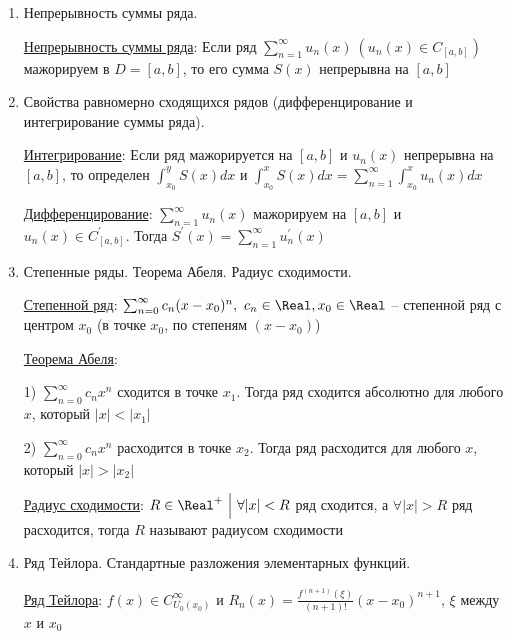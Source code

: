 \begin{enumerate}
    Тогда $\sum_{n = 1}^\infty u_n(x)$ равномерно сходящийся, а $\sum_{n = 1}^\infty \alpha_n$ называют мажорирующим

    \item Непрерывность суммы ряда.

    \hyperlink{functionalsumcontinuity}{Непрерывность суммы ряда}: \Ths Если ряд $\sum_{n = 1}^\infty u_n(x) \ (u_n(x) \in C_{[a, b]})$ мажорируем в $D = [a, b]$, то 
    его сумма $S(x)$ непрерывна на $[a, b]$

    \item Свойства равномерно сходящихся рядов (дифференцирование и интегрирование суммы
    ряда).

    \hyperlink{functionalsumintegral}{Интегрирование}: \Ths Если ряд мажорируется на $[a, b]$ и $u_n(x)$ непрерывна на $[a, b]$, то определен $\int_{x_0}^y S(x)dx$ и 
    $\int_{x_0}^x S(x)dx  = \sum_{n = 1}^\infty \int_{x_0}^x u_n(x) dx$

    \hyperlink{functionalsumderivative}{Дифференцирование}: \Ths $\sum_{n = 1}^\infty u_n(x)$ мажорируем на $[a, b]$ и $u_n(x) \in C^\prime_{[a, b]}$.
    Тогда $S^\prime(x) = \sum_{n = 1}^\infty u^\prime_n(x)$

    \item Степенные ряды. Теорема Абеля. Радиус сходимости.

    \hyperlink{powerseries}{Степенной ряд}: $\sum_{n = 0}^\infty c_n(x - x_0)^n, \ c_n \in \Real, x_0 \in \Real$ -- степенной ряд с центром $x_0$ (в точке $x_0$, по степеням $(x - x_0)$)

    \hyperlink{abelstheorem}{Теорема Абеля}:  

    1) $\sum_{n = 0}^\infty c_n x^n$ сходится в точке $x_1$. Тогда ряд сходится абсолютно для любого $x$, который $|x| < |x_1|$

    2) $\sum_{n = 0}^\infty c_n x^n$ расходится в точке $x_2$. Тогда ряд расходится для любого $x$, который $|x| > |x_2|$

    \hyperlink{convergenceradius}{Радиус сходимости}: $R \in \Real^+ \ \Big| \ \forall |x| < R $ ряд сходится, а $\forall |x| > R$ ряд расходится, тогда $R$ называют радиусом сходимости

    \item Ряд Тейлора. Стандартные разложения элементарных функций.

    \hyperlink{taylorsseries}{Ряд Тейлора}: $f(x) \in C^\infty_{U_0(x_0)}$ и $R_n(x) = \frac{f^{(n + 1)}(\xi)}{(n + 1)!} (x - x_0)^{n + 1}$, $\xi$ между $x$ и $x_0$
    

\end{enumerate}
